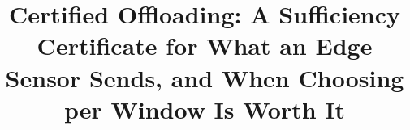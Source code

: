 \documentclass[11pt]{article}
\title{Certified Offloading: A Sufficiency Certificate for What an Edge Sensor Sends,
and When Choosing per Window Is Worth It}
\author{\todo{authors and affiliations}}
\date{\todo{date of the arXiv version}}
\begin{document}
\maketitle

\begin{abstract}

\end{abstract}














\appendix

\end{document}
